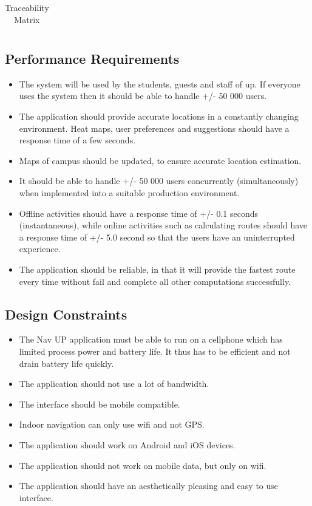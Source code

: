 \documentclass[12pt]{article}
\begin{document}
\begin{table}
\begin{tabular}{|lc|c|c|c|c|c|c|}
		\hline
	\end{tabular}
	\caption{Traceability Matrix} 
	\label{table:nonlin}
	\end{table}
		
	\subsection{Performance Requirements}
	\begin{itemize}
		\item The system will be used by the students, guests and staff of up. If everyone uses the system then it should be able to handle +/- 50 000 users. 
		\item The application should provide accurate locations in a constantly changing environment. Heat maps, user preferences and suggestions should have a response time of a few seconds.
		\item Maps of campus should be updated, to ensure accurate location estimation. 
		\item It should be able to handle +/- 50 000 users concurrently (simultaneously) when implemented into a suitable production environment. 
		\item Offline activities should have a response time of +/- 0.1 seconds (instantaneous), while online activities such as calculating routes should have a response time of +/- 5.0 second so that the users have an uninterrupted experience. 
		\item The application should be reliable, in that it will provide the fastest route every time without fail and complete all other computations successfully. 
	\end{itemize}
	\subsection{Design Constraints}
	\begin{itemize}
		\item The Nav UP application must be able to run on a cellphone which has limited process power and battery life. It thus has to be efficient and not drain battery life quickly.
		\item The application should not use a lot of bandwidth.
		\item The interface should be mobile compatible.
		\item Indoor navigation can only use wifi and not GPS.
		\item The application should work on Android and iOS devices.
		\item The application should not work on mobile data, but only on wifi.
		\item The application should have an aesthetically pleasing and easy to use interface. 
	\end{itemize}
\end{document}
